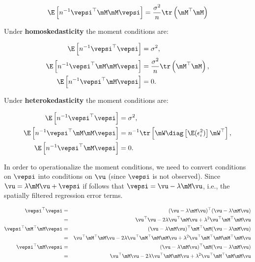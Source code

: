 \documentclass[english,12pt]{book}\usepackage[]{graphicx}\usepackage[]{xcolor}
\begin{document}
\begin{equation*}
\E\left[n^{-1}\vepsi^\top\mM\mM\vepsi\right] = \frac{\sigma^2}{n}\tr\left(\mM^\top\mM\right)
\end{equation*}

\begin{definition}\label{def:moment_conditions}

Under \textbf{homoskedasticity} \citep{kelejian1999generalized} the moment conditions are:

\begin{equation*}
  \begin{aligned}
  \E\left[n^{-1}\vepsi^\top \vepsi\right] &= \sigma^2, \\
   \E\left[n^{-1}\vepsi^\top\mM\mM\vepsi\right] &= \frac{\sigma^2}{n}\tr\left(\mM^\top\mM\right),\\
   \E\left[n^{-1}\vepsi^\top \mM \vepsi \right] & =  0.
  \end{aligned}
\end{equation*}

Under \textbf{heterokedasticity} \citep{kelejian2010specification} the moment conditions are:


\begin{equation*}
  \begin{aligned}
  \E\left[n^{-1}\vepsi^\top \vepsi\right] &= \sigma^2, \\
   \E\left[n^{-1}\vepsi^\top\mM\mM\vepsi\right] &= n^{-1}\tr\left[\mW\diag\left[\E(\epsilon_i^2)\right]\mW^\top\right],\\
   \E\left[n^{-1}\vepsi^\top \mM \vepsi \right] & =  0.
  \end{aligned}
\end{equation*}
\end{definition}


In order to operationalize the moment conditions, we need to convert conditions on $\vepsi$ into conditions on $\vu$ (since $\vepsi$ is not observed). Since $\vu = \lambda \mM\vu + \vepsi$ if follows that $\vepsi = \vu - \lambda\mM\vu$, i.e., the spatially filtered regression error terms. 


\begin{eqnarray}
\vepsi^\top \vepsi & = & (\vu - \lambda\mM\vu)^\top(\vu - \lambda\mM\vu) \nonumber \\ 
                   & = & \vu^\top\vu - 2\lambda\vu^\top\mM\vu + \lambda^2\vu^\top\mM^\top\mM\vu \label{eq:mom_1}\\
\vepsi^\top \mM^\top\mM \vepsi& = &(\vu - \lambda\mM\vu)^\top\mM^\top\mM(\vu - \lambda\mM\vu) \nonumber \\
                   &= & \vu^\top\mM^\top\mM\vu - 2\lambda\vu^\top\mM^\top\mM\mM\vu + \lambda^2\vu^\top\mM^\top\mM\mM^\top\mM\vu \label{eq:mom_2} \\
\vepsi^\top\mM \vepsi& = &(\vu - \lambda\mM\vu)^\top\mM(\vu - \lambda\mM\vu) \nonumber \\ 
                   &=& \vu^\top\mM\vu - 2\lambda\vu^\top\mM\mM\vu + \lambda^2\vu^\top\mM^\top\mM\mM\vu \label{eq:mom_3}
\end{eqnarray}
\end{document}
